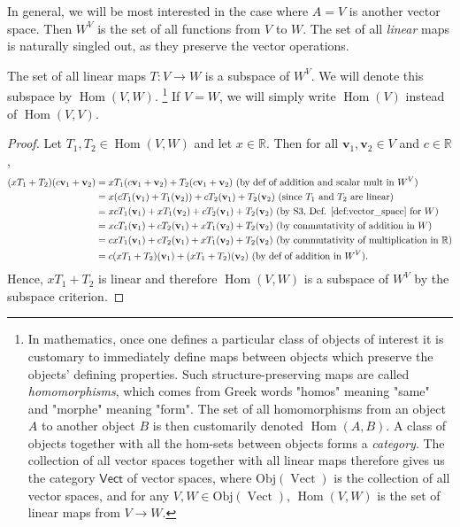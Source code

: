 \documentclass[12pt,letterpaper,reqno]{article}
\numberwithin{equation}{section}
\newcommand{\R}{\ensuremath{\mathbb R}}
\newcommand{\Obj}{\mathrm{Obj}}
\DeclareMathOperator{\Hom}{Hom}
\DeclareMathOperator{\Vect}{Vect}
\begin{document}
In general, we will be most interested in the case where $A=V$ is another vector space. Then $W^V$ is the set of all functions from $V$ to $W$. The set of all \emph{linear} maps is naturally singled out, as they preserve the vector operations.

\begin{prop}
The set of all linear maps $T:V \to W$ is a subspace of $W^V$. We will denote this subspace by $\Hom(V,W)$. \footnote{In mathematics, once one defines a particular class of objects of interest it is customary to immediately define maps between objects which preserve the objects' defining properties. Such structure-preserving maps are called \emph{homomorphisms}, which comes from Greek words "homos" meaning "same" and "morphe" meaning "form". The set of all homomorphisms from an object $A$ to another object $B$ is then customarily denoted $\Hom(A,B)$. A class of objects together with all the hom-sets between objects forms a \emph{category}. The collection of all vector spaces together with all linear maps therefore gives us the category $\mathsf{Vect}$ of vector spaces, where $\Obj(\Vect)$ is the collection of all vector spaces, and for any $V,W \in \Obj(\Vect)$, $\Hom(V,W)$ is the set of linear maps from $V \to W$.} If $V=W$, we will simply write $\Hom(V)$ instead of $\Hom(V,V)$.	
\end{prop}

\begin{proof}
Let $T_1,T_2 \in \Hom(V,W)$ and let $x \in \R$. Then for all $\mathbf{v}_1,\mathbf{v}_2 \in V$ and $c \in \mathbb{R}$,
\begin{align*}
	(xT_1+T_2)(c\mathbf{v}_1+\mathbf{v}_2)&=xT_1 (c\mathbf{v}_1+\mathbf{v}_2)+T_2 (c\mathbf{v}_1+\mathbf{v}_2) \text{ (by def of addition and scalar mult in $W^V$) }\\
	&=x(cT_1 (\mathbf{v}_1)+T_1 (\mathbf{v}_2))+cT_2 (\mathbf{v}_1)+T_2 (\mathbf{v}_2) \text{ (since $T_1$ and $T_2$ are linear) } \\
	&=xcT_1(\mathbf{v}_1)+xT_1(\mathbf{v}_2)+cT_2(\mathbf{v}_1)+T_2(\mathbf{v}_2) \text{ (by S3, Def. \ref{def:vector_space} for $W$) }\\
	&=xcT_1(\mathbf{v}_1)+cT_2(\mathbf{v}_1)+xT_1(\mathbf{v}_2)+T_2(\mathbf{v}_2) \text{ (by commutativity of addition in $W$)} \\
	&=cxT_1(\mathbf{v}_1)+cT_2(\mathbf{v}_1)+xT_1(\mathbf{v}_2)+T_2(\mathbf{v}_2) \text{ (by commutativity of multiplication in $\R$)} \\
	&=c(xT_1+T_2)(\mathbf{v}_1)+(xT_1+T_2)(\mathbf{v}_2) \text{ (by def of addition in $W^V$)}.
\end{align*}	
Hence, $xT_1+T_2$ is linear and therefore $\Hom(V,W)$ is a subspace of $W^V$ by the subspace criterion.
\end{proof}
\end{document}
